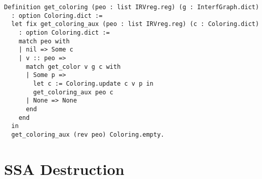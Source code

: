 \begin{lstlisting}[style=Coq]
Definition get_coloring (peo : list IRVreg.reg) (g : InterfGraph.dict)
  : option Coloring.dict :=
  let fix get_coloring_aux (peo : list IRVreg.reg) (c : Coloring.dict)
    : option Coloring.dict :=
    match peo with
    | nil => Some c
    | v :: peo =>
      match get_color v g c with
      | Some p =>
        let c := Coloring.update c v p in
        get_coloring_aux peo c
      | None => None
      end
    end
  in
  get_coloring_aux (rev peo) Coloring.empty.
\end{lstlisting}

\section{SSA Destruction}
\label{sec:destruct}

